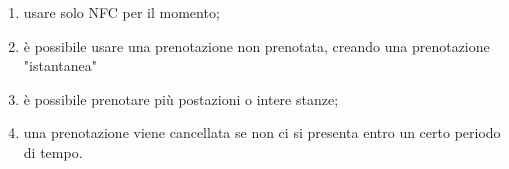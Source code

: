 \begin{enumerate}
    \item usare solo NFC per il momento;
    \item è possibile usare una prenotazione non prenotata, creando una prenotazione "istantanea"
    \item è possibile prenotare più postazioni o intere stanze;
    \item una prenotazione viene cancellata se non ci si presenta entro un certo periodo di tempo.
\end{enumerate}